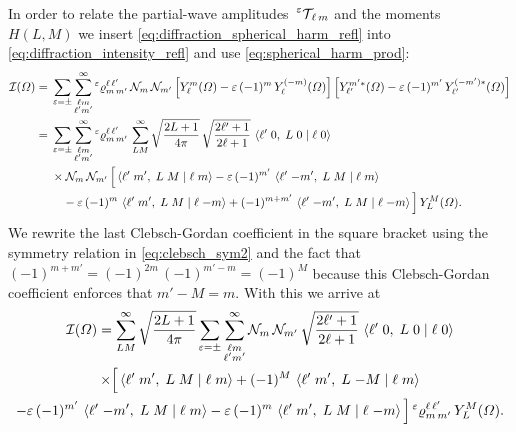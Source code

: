 In order to relate the partial-wave
amplitudes~$\prescript{\ensuremath{\varepsilon}}{}{\ensuremath{\mathcal{T}}}_{\!\ell\, m}$ and the
moments~$H(L, M)$ we insert \cref{eq:diffraction_spherical_harm_refl}
into \cref{eq:diffraction_intensity_refl} and use
\cref{eq:spherical_harm_prod}:
\begin{align}
  \intensity(\Omega)
  ={}&
    \sum_{\refl = \pm} \sum_{\substack{\ell m \\ \ell' m'}}^\infty
    \prescript{\refl}{}{\varrho}^{\ell\, \ell'}_{m\, m'}\,
    \mathcal{N}_m\, \mathcal{N}_{m'}
    \sBrk[2]{Y_\ell^m(\Omega) - \refl\, (-1)^m\, Y_\ell^{(-m)}(\Omega)}
    \sBrk[2]{Y_{\ell'}^{m' *}(\Omega) - \refl\, (-1)^{m'}\, Y_{\ell'}^{(-m') *}(\Omega)}
  \\
  ={}& \begin{multlined}[t][0.85\columnwidth]
    \sum_{\refl = \pm} \sum_{\substack{\ell m \\ \ell' m'}}^\infty
    \prescript{\refl}{}{\varrho}^{\ell\, \ell'}_{m\, m'}\,
    \sum_{L M}^\infty \sqrt{\frac{2 L + 1}{4 \pi}}\, \sqrt{\frac{2 \ell' + 1}{2 \ell + 1}}\, \clebsch{\ell'}{0}{L}{0}{\ell}{0}
    \\
    \shoveleft{\times \mathcal{N}_m\, \mathcal{N}_{m'}\, \Big[ \clebsch{\ell'}{m'}{L}{M}{\ell}{m}
      - \refl\, (-1)^{m'}\, \clebsch{\ell'}{-m'}{L}{M}{\ell}{m}}
    \\
    - \refl\, (-1)^m\, \clebsch{\ell'}{m'}{L}{M}{\ell}{-m} + (-1)^{m + m'}\, \clebsch{\ell'}{-m'}{L}{M}{\ell}{-m} \Big]\,
    Y_L^M(\Omega).
  \end{multlined}
\end{align}
We rewrite the last Clebsch-Gordan coefficient in the square bracket
using the symmetry relation in \cref{eq:clebsch_sym2} and the fact
that $(-1)^{m + m'} = (-1)^{2m}\, (-1)^{m' - m} = (-1)^M$ because this
Clebsch-Gordan coefficient enforces that $m' - M = m$.  With this we
arrive at
\begin{multline}
  \mathcal{I}(\Omega)
  = \sum_{L M}^\infty \sqrt{\frac{2 L + 1}{4 \pi}}
  \sum_{\varepsilon = \pm} \sum_{\substack{\ell m \\ \ell' m'}}^\infty
  \mathcal{N}_m\, \mathcal{N}_{m'}\,
  \sqrt{\frac{2 \ell' + 1}{2 \ell + 1}}\,
  \braket{{\ell'}\;{0},\;{L}\;{0}\; |\; {\ell}\;{0}}
  \\
  \times \Big[
    \braket{{\ell'}\;{m'},\;{L}\;{M}\; |\; {\ell}\;{m}}
    + (-1)^M\, \braket{{\ell'}\;{m'},\;{L}\;{-M}\; |\; {\ell}\;{m}}
    \\
    - \varepsilon\, (-1)^{m'}\, \braket{{\ell'}\;{-m'},\;{L}\;{M}\; |\; {\ell}\;{m}}
    - \varepsilon\, (-1)^m\, \braket{{\ell'}\;{m'},\;{L}\;{M}\; |\; {\ell}\;{-m}} \Big]
  \prescript{\ensuremath{\varepsilon}}{}{\varrho}^{\ell\, \ell'}_{m\, m'}\,
  Y_L^M(\Omega).
\end{multline}
